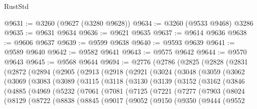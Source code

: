 \begin{lexlean}{RustStd}
\begin{coremodule}
{\begin{coremodule}
{{{{{{{{{{{{{{{{{{{{{{{{{{@9631 := @3260 (@9627 (@3280 @9628))
@9634 := @3260 (@9533 @9468) @3286
@9635 := @9631 @9634
@9636 := @9621 @9635
@9637 := @9614 @9636
@9638 := @9606 @9637
@9639 := @9599 @9638
@9640 := @9593 @9639
@9641 := @9589 @9640
@9642 := @9582 @9641
@9643 := @9575 @9642
@9644 := @9570 @9643
@9645 := @9568 @9644
@9694 := @2776
    (@2786
      (@2825
        (@2828
          (@2831
            (@2872
              (@2894
                (@2905
                  (@2913
                    (@2918
                      (@2921
                        (@3024
                          (@3048
                            (@3059
                              (@3062
                                (@3069
                                  (@3083
                                    (@3089
                                      (@3115
                                        (@3118
                                          (@3130
                                            (@3139
                                              (@3152
                                                (@3162
                                                  (@3846
                                                    (@4885
                                                      (@4969
                                                        (@5232
                                                          (@7061
                                                            (@7081
                                                              (@7125
                                                                (@7221
                                                                  (@7277
                                                                    (@7903
                                                                      (@8024
                                                                        (@8129
                                                                          (@8722
                                                                            (@8838
                                                                              (@8845
                                                                                (@9017
                                                                                  (@9052
                                                                                    (@9150
                                                                                      (@9350
                                                                                        (@9444
                                                                                          (@9552
}}}}}}}}}}}}}}}}}}}}}}}}}}
\end{coremodule}}
\end{coremodule}
\end{lexlean}
